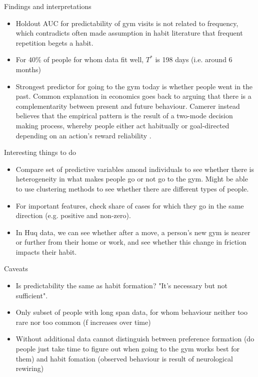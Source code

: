 \documentclass[a4paper, 11pt]{report}
\begin{document}
Findings and interpretations
\begin{itemize}
    \item Holdout AUC for predictability of gym visits is not related to
        frequency, which contradicts often made assumption in habit literature
        that frequent repetition begets a habit.

    \item For 40\% of people for whom data fit well, $T^*$ is 198 days (i.e.
        around 6 months)

    \item Strongest predictor for going to the gym today is whether people went
        in the past. Common explanation in economics goes back to
        \citet{becker1988} arguing that there is a complementarity between
        present and future behaviour. Camerer instead believes that the
        empirical pattern is the result of a two-mode decision making process,
        whereby people either act habitually or goal-directed depending on an
        action's reward reliability \citep{camerer2018neuroeconomics}.
\end{itemize}

Interesting things to do
\begin{itemize}
    \item Compare set of predictive variables amond individuals to see whether
        there is heterogeneity in what makes people go or not go to the gym.
        Might be able to use clustering methods to see whether there are
        different types of people.

    \item For important features, check share of cases for which they go in the
        same direction (e.g. positive and non-zero).

    \item In Huq data, we can see whether after a move, a person's new gym is
        nearer or further from their home or work, and see whether this change
        in friction impacts their habit.
\end{itemize}

Caveats
\begin{itemize}

    \item Is predictability the same as habit formation? "It's necessary but not
        sufficient".

    \item Only subset of people with long span data, for whom behaviour neither
        too rare nor too common (f increases over time)
    
    \item Without additional data cannot distinguish between preference
        formation (do people just take time to figure out when going to the gym
        works best for them) and habit fomation (observed behaviour is result of
        neurological rewiring)
\end{itemize}
\end{document}
